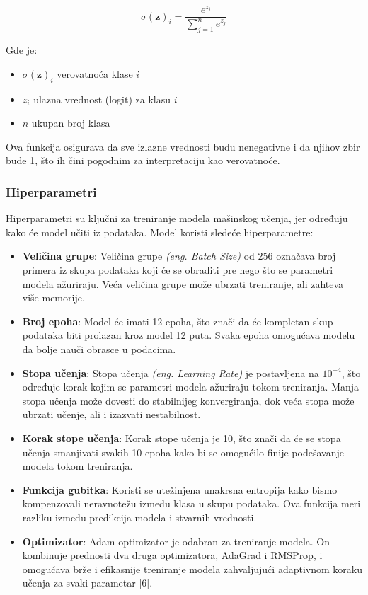 \documentclass{article}
\begin{document}
\[ \sigma(\mathbf{z})_i = \frac{e^{z_i}}{\sum_{j=1}^n e^{z_j}} \]

Gde je:
\begin{itemize}
    \item \( \sigma(\mathbf{z})_i \) verovatnoća klase \(i\)
    \item \( z_i \) ulazna vrednost (logit) za klasu \(i\)
    \item \( n \) ukupan broj klasa
\end{itemize}

Ova funkcija osigurava da sve izlazne vrednosti budu nenegativne i da njihov zbir bude 1, što ih čini pogodnim za interpretaciju kao verovatnoće.

\subsubsection{Hiperparametri}

Hiperparametri su ključni za treniranje modela mašinskog učenja, jer određuju kako će model učiti iz podataka. Model koristi sledeće hiperparametre:

\begin{itemize}
    \item \textbf{Veličina grupe}: Veličina grupe \textit{(eng. Batch Size)} od 256 označava broj primera iz skupa podataka koji će se obraditi pre nego što se parametri modela ažuriraju. Veća veličina grupe može ubrzati treniranje, ali zahteva više memorije.
    \item \textbf{Broj epoha}: Model će imati 12 epoha, što znači da će kompletan skup podataka biti prolazan kroz model 12 puta. Svaka epoha omogućava modelu da bolje nauči obrasce u podacima.
    \item \textbf{Stopa učenja}: Stopa učenja \textit{(eng. Learning Rate)} je postavljena na $10^{-4}$, što određuje korak kojim se parametri modela ažuriraju tokom treniranja. Manja stopa učenja može dovesti do stabilnijeg konvergiranja, dok veća stopa može ubrzati učenje, ali i izazvati nestabilnost.
    \item \textbf{Korak stope učenja}: Korak stope učenja je 10, što znači da će se stopa učenja smanjivati svakih 10 epoha kako bi se omogućilo finije podešavanje modela tokom treniranja.
    \item \textbf{Funkcija gubitka}: Koristi se utežinjena unakrsna entropija kako bismo kompenzovali neravnotežu između klasa u skupu podataka. Ova funkcija meri razliku između predikcija modela i stvarnih vrednosti.
    \item \textbf{Optimizator}: Adam optimizator je odabran za treniranje modela. On kombinuje prednosti dva druga optimizatora, AdaGrad i RMSProp, i omogućava brže i efikasnije treniranje modela zahvaljujući adaptivnom koraku učenja za svaki parametar [6].
\end{itemize}
\end{document}
